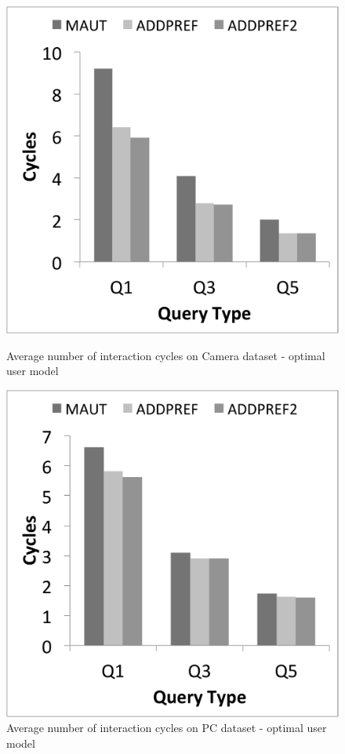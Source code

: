 \begin{figure}[h]
\centering
\begin{minipage}{.45\textwidth}
  \centering
  \includegraphics[width=1\linewidth]{figures-bharath/addPref_camera_opt}
  \caption[]{Average number of interaction cycles on Camera dataset - optimal user model}
  \label{fig:addPref_camera_opt}
\end{minipage}%
\;\;\;\;\;\;
\begin{minipage}{.45\textwidth}
  \centering
  \includegraphics[width=1\linewidth]{figures-bharath/addPref_pc_opt}
  \caption[]{Average number of interaction cycles on PC dataset - optimal user model}
  \label{fig:addPref_pc_opt}
\end{minipage}
\end{figure}

